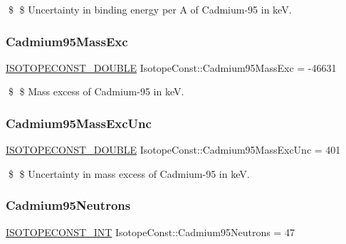 \$ \$ Uncertainty in binding energy per A of Cadmium-\/95 in keV. \mbox{\label{group___isotope_const-_cadmium-_cd95_ga1c54f53c918f52c76cfcd6c6e542ae41}} 
\subsubsection{\texorpdfstring{Cadmium95\+Mass\+Exc}{Cadmium95MassExc}}
{\footnotesize\ttfamily \mbox{\hyperlink{group___isotope_const-_macros_ga8f45a7272ce02c0b4c65c44636ed719a}{I\+S\+O\+T\+O\+P\+E\+C\+O\+N\+S\+T\+\_\+\+D\+O\+U\+B\+LE}} Isotope\+Const\+::\+Cadmium95\+Mass\+Exc = -\/46631}

\$ \$ Mass excess of Cadmium-\/95 in keV. \mbox{\label{group___isotope_const-_cadmium-_cd95_ga74e3f054f425698a877e03bc70b68c4b}} 
\subsubsection{\texorpdfstring{Cadmium95\+Mass\+Exc\+Unc}{Cadmium95MassExcUnc}}
{\footnotesize\ttfamily \mbox{\hyperlink{group___isotope_const-_macros_ga8f45a7272ce02c0b4c65c44636ed719a}{I\+S\+O\+T\+O\+P\+E\+C\+O\+N\+S\+T\+\_\+\+D\+O\+U\+B\+LE}} Isotope\+Const\+::\+Cadmium95\+Mass\+Exc\+Unc = 401}

\$ \$ Uncertainty in mass excess of Cadmium-\/95 in keV. \mbox{\label{group___isotope_const-_cadmium-_cd95_gaa80abdaad1dc1c0892c3b7818e0ebd07}} 
\subsubsection{\texorpdfstring{Cadmium95\+Neutrons}{Cadmium95Neutrons}}
{\footnotesize\ttfamily \mbox{\hyperlink{group___isotope_const-_macros_ga5f18360b3e99483a35c32d789e62621c}{I\+S\+O\+T\+O\+P\+E\+C\+O\+N\+S\+T\+\_\+\+I\+NT}} Isotope\+Const\+::\+Cadmium95\+Neutrons = 47}

